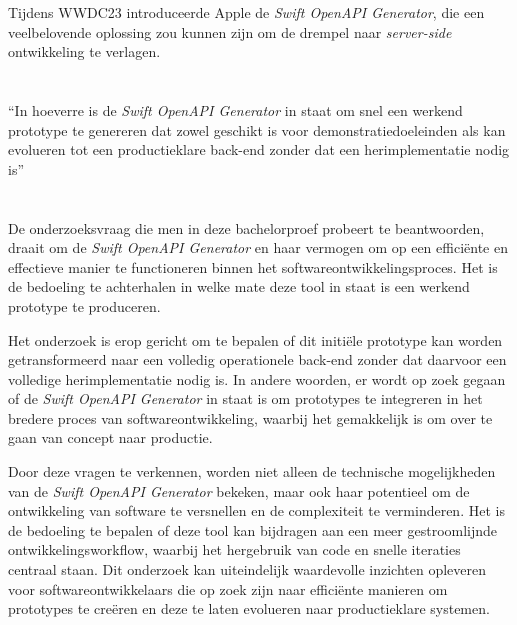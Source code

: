 Tijdens WWDC23 introduceerde Apple de \textit{Swift OpenAPI Generator}, die een veelbelovende oplossing zou kunnen zijn om de drempel naar \textit{server-side} ontwikkeling te verlagen.


\section{}%
\label{sec:onderzoeksvraag}

“In hoeverre is de \textit{Swift OpenAPI Generator} in staat om snel een werkend prototype te genereren dat zowel geschikt is voor demonstratiedoeleinden als kan evolueren tot een productieklare back-end zonder dat een herimplementatie nodig is”

\section{}%
\label{sec:onderzoeksdoelstelling}

De onderzoeksvraag die men in deze bachelorproef probeert te beantwoorden, draait om de \textit{Swift OpenAPI Generator} en haar vermogen om op een efficiënte en effectieve manier te functioneren binnen het softwareontwikkelingsproces. Het is de bedoeling te achterhalen in welke mate deze tool in staat is een werkend prototype te produceren. 

Het onderzoek is erop gericht om te bepalen of dit initiële prototype kan worden getransformeerd naar een volledig operationele back-end zonder dat daarvoor een volledige herimplementatie nodig is. In andere woorden, er wordt op zoek gegaan of de \textit{Swift OpenAPI Generator} in staat is om prototypes te integreren in het bredere proces van softwareontwikkeling, waarbij het gemakkelijk is om over te gaan van concept naar productie.

Door deze vragen te verkennen, worden niet alleen de technische mogelijkheden  van de  \textit{Swift OpenAPI Generator} bekeken, maar ook haar potentieel om de ontwikkeling van software te versnellen en de complexiteit te verminderen. Het is de bedoeling te bepalen of deze tool kan bijdragen aan een meer gestroomlijnde ontwikkelingsworkflow, waarbij het hergebruik van code en snelle iteraties centraal staan. Dit onderzoek kan uiteindelijk waardevolle inzichten opleveren voor softwareontwikkelaars die op zoek zijn naar efficiënte manieren om prototypes te creëren en deze te laten evolueren naar productieklare systemen.



